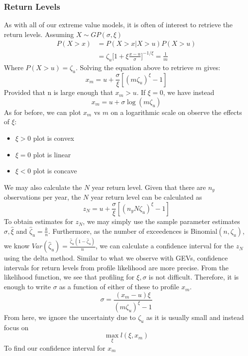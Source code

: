 \documentclass{article}
\theoremstyle{definition}
\theoremstyle{definition}
\begin{document}
\subsubsection{Return Levels }
As with all of our extreme value models, it is often of interest to retrieve the return levels. Assuming $X\sim GP(\sigma,\xi)$
\begin{align*}
    P(X>x)&= P(X>x|X>u)P(X>u)\\
    &=\zeta_u \bigg[ 1+ \xi\frac{x-u}{\sigma} \bigg]^{-1/\xi}= \frac{1}{m}
\end{align*}
Where $P(X>u)=\zeta_u$. Solving the equation above to retrieve $m$ gives:
\[x_m= u+ \frac{\sigma}{\xi}[(m\zeta_u)^\xi -1]\]
Provided that n is large enough that $x_m>u$. If $\xi=0$, we have instead
\[x_m= u+\sigma\log(m\zeta_u)\]
As for before, we can plot $x_m$ vs $m$ on a logarithmic scale on observe the effects of $\xi$:
\begin{itemize}
    \item $\xi>0$ plot is convex
    \item $\xi=0$ plot is linear 
    \item $\xi<0$ plot is concave
\end{itemize}
We may also calculate the $N$ year return level. Given that there are $n_y$ observations per year, the $N$ year return level can be calculated as  
\[z_N= u +\frac{\sigma}{\xi}[(n_yN\zeta_u)^\xi -1]\]
To obtain estimates for $z_N$, we may simply use the sample parameter estimates $\hat{\sigma}, \hat{\xi}$ and $\hat{\zeta}_u= \frac{k}{n}$. Furthermore, as the number of exceedences is Binomial$(n, \zeta_u)$, we know $Var(\hat{\zeta}_u)= \frac{\hat{\zeta}_u(1-\hat{\zeta}_u)}{n}$, we can calculate a confidence interval for the $z_N$ using the delta method. Similar to what we observe with GEVs, confidence intervals for return levels from profile likelihood are more precise. From the likelihood function, we see that profiling for $\xi,\sigma$ is not difficult. Therefore, it is enough to write $\sigma$ as a function of either of these to profile $x_m$.
\[\sigma= \frac{(x_m-u)\xi}{(m\zeta_u)^\xi-1}\]
From here, we ignore the uncertainty due to $\zeta_u$ as it is usually small and instead focus on 
\[\max_{\xi}l(\xi, x_m)\]
To find our confidence interval for $x_m$
\end{document}
